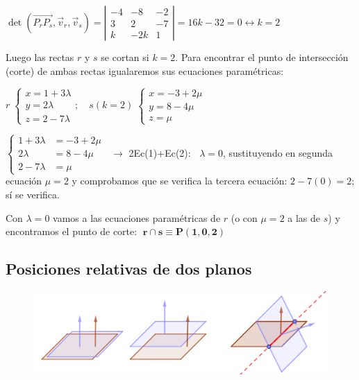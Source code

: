 \begin{proofw}
\noindent $\det(\overrightarrow{P_rP_s},\vec v_r, \vec v_s)=\left| \begin{matrix} -4&-8&-2 \\3&2&-7\\k&-2k&1 \end{matrix} \right|=16k-32=0 \leftrightarrow k=2$

\noindent Luego las rectas $r$ y $s$ se cortan si $k=2$. Para encontrar el punto de intersección (corte) de ambas rectas igualaremos sus ecuaciones paramétricas:

\noindent $r\; \begin{cases} x=1+3\lambda \\ y=2\lambda \\ z= 2-7\lambda \end{cases} ;\quad s(k=2)\; \begin{cases} x=-3+2	\mu\\y=8-4\mu\\z=\mu \end{cases} $

\noindent $\begin{cases} 1+3\lambda &=-3+2\mu \\ 2\lambda &=8-4\mu \\ 2-7\lambda &=\mu \end{cases}\;\;\to $ 2Ec(1)+Ec(2): $\;\;\lambda=0$, sustituyendo en segunda ecuación $\mu=2$ y comprobamos que se verifica la tercera ecuación: $2-7(0)=2$; sí se verifica.

\noindent Con $\lambda =0$ vamos a las ecuaciones paramétricas de $r$ (o con $\mu =2$ a las de $s$) y encontramos el punto de corte: $\; \boldsymbol{r \cap s \equiv P(1,0,2)}$

\end{proofw}

\subsection{Posiciones relativas de dos planos}

	\begin{figure}[H]
		\centering
		\includegraphics[width=1\textwidth]{imagenes/imagenes10/T10IM10.png}
 	\end{figure}

